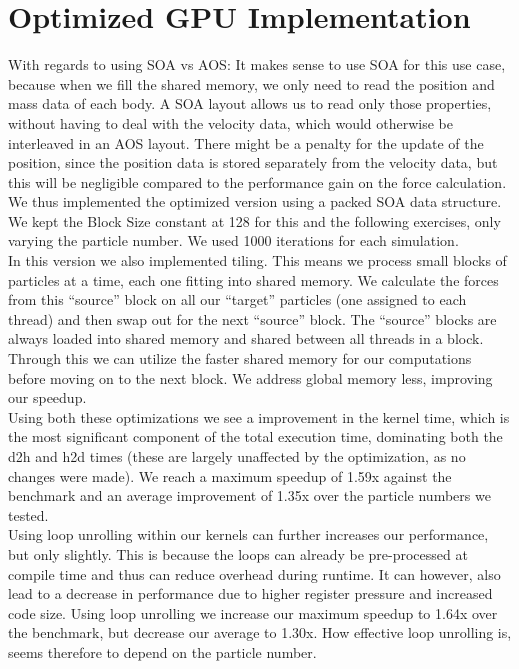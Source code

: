 ﻿\newpage
\section{Optimized GPU Implementation}
With regards to using SOA vs AOS: It makes sense to use SOA for this use case, because when we fill the shared memory, we only need to read the position and mass data of each body. A SOA layout allows us to read only those properties, without having to deal with the velocity data, which would otherwise be interleaved in an AOS layout. There might be a penalty for the update of the position, since the position data is stored separately from the velocity data, but this will be negligible compared to the performance gain on the force calculation.\\

We thus implemented the optimized version using a packed SOA data structure. We kept the Block Size constant at 128 for this and the following exercises, only varying the particle number. We used 1000 iterations for each simulation. \\

In this version we also implemented tiling. This means we process small blocks of particles at a time, each one fitting into shared memory. We calculate the forces from this “source” block on all our “target” particles (one assigned to each thread) and then swap out for the next “source” block. The “source” blocks are always loaded into shared memory and shared between all threads in a block. Through this we can utilize the faster shared memory for our computations before moving on to the next block. We address global memory less, improving our speedup. \\

Using both these optimizations we see a improvement in the kernel time, which is the most significant component of the total execution time, dominating both the d2h and h2d times (these are largely unaffected by the optimization, as no changes were made). We reach a maximum speedup of 1.59x against the benchmark and an average improvement of 1.35x over the particle numbers we tested. \\

Using loop unrolling within our kernels can further increases our performance, but only slightly. This is because the loops can already be pre-processed at compile time and thus can reduce overhead during runtime. It can however, also lead to a decrease in performance due to higher register pressure and increased code size. Using loop unrolling we increase our maximum speedup to 1.64x over the benchmark, but decrease our average to 1.30x. How effective loop unrolling is, seems therefore to depend on the particle number.
